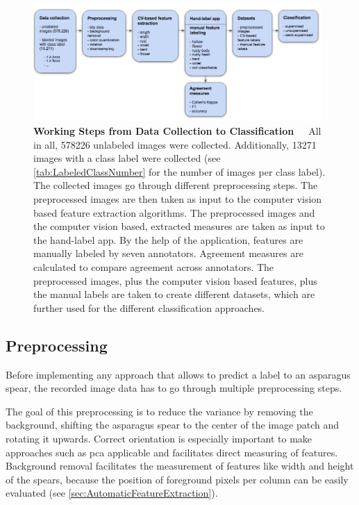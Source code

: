 \begin{figure}[!hb]
	\centering
	\includegraphics[width=0.98\textwidth]{Figures/chapter03/working_steps.png}
	\decoRule
	\caption[Working Steps from Data Collection to Classification]{\textbf{Working Steps from Data Collection to Classification}~~~All in all, 578226 unlabeled images were collected. Additionally, 13271 images with a class label were collected (see \autoref{tab:LabeledClassNumber} for the number of images per class label). The collected images go through different preprocessing steps. The preprocessed images are then taken as input to the computer vision based feature extraction algorithms. The preprocessed images and the computer vision based, extracted measures are taken as input to the hand-label app. By the help of the application, features are manually labeled by seven annotators. Agreement measures are calculated to compare agreement across annotators. The preprocessed images, plus the computer vision based features, plus the manual labels are taken to create different datasets, which are further used for the different classification approaches.}
	\label{fig:WorkingSteps}
\end{figure}


\subsection{Preprocessing}
\label{sec:Preprocessing}

Before implementing any approach that allows to predict a label to an asparagus spear, the recorded image data has to go through multiple preprocessing steps.

The goal of this preprocessing is to reduce the variance by removing the background, shifting the asparagus spear to the center of the image patch and rotating it upwards. Correct orientation is especially important to make approaches such as \acrshort{pca} applicable and facilitates direct measuring of features. Background removal facilitates the measurement of features like width and height of the spears, because the position of foreground pixels per column can be easily evaluated (see \autoref{sec:AutomaticFeatureExtraction}).

